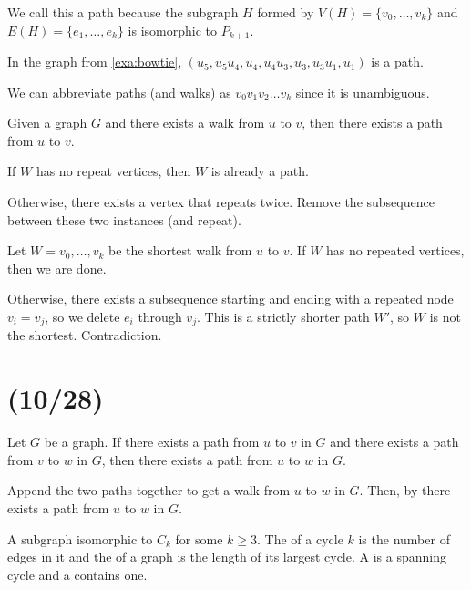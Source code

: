\documentclass[class=math239,notes,tikz]{agony}
\begin{document}
We call this a path because the subgraph $H$ formed by $V(H) = \{v_0,\dotsc,v_k\}$
and $E(H) = \{e_1,\dotsc,e_k\}$ is isomorphic to $P_{k+1}$.

\begin{example}
  In the graph from \cref{exa:bowtie}, $(u_5,u_5u_4,u_4,u_4u_3,u_3,u_3u_1,u_1)$ is a path.
\end{example}

We can abbreviate paths (and walks) as $v_0v_1v_2\dots v_k$ since it is unambiguous.

\begin{theorem}[4.6.2]\label{thm:pathwalk}
  Given a graph $G$ and there exists a walk from $u$ to $v$,
  then there exists a path from $u$ to $v$.
\end{theorem}
\begin{prf}[informal]
  If $W$ has no repeat vertices, then $W$ is already a path.

  Otherwise, there exists a vertex that repeats twice.
  Remove the subsequence between these two instances (and repeat).
\end{prf}
\begin{prf}
  Let $W = v_0,\dotsc,v_k$ be the shortest walk from $u$ to $v$.
  If $W$ has no repeated vertices, then we are done.

  Otherwise, there exists a subsequence starting and ending with a repeated
  node $v_i = v_j$, so we delete $e_i$ through $v_j$.
  This is a strictly shorter path $W'$, so $W$ is not the shortest. Contradiction.
\end{prf}

\section{(10/28)}

\begin{corollary}[4.6.3]\label{cor:463}
  Let $G$ be a graph. If there exists a path from $u$ to $v$ in $G$
  and there exists a path from $v$ to $w$ in $G$,
  then there exists a path from $u$ to $w$ in $G$.
\end{corollary}
\begin{prf}
  Append the two paths together to get a walk from $u$ to $w$ in $G$.
  Then, by  there exists a path from $u$ to $w$ in $G$.
\end{prf}

\begin{defn}[cycle]
  A subgraph isomorphic to $C_k$ for some $k \geq 3$.
  The  of a cycle $k$ is the number of edges in it
  and the  of a graph is the length of its largest cycle.
  A  is a spanning cycle
  and a  contains one.
\end{defn}
\end{document}

